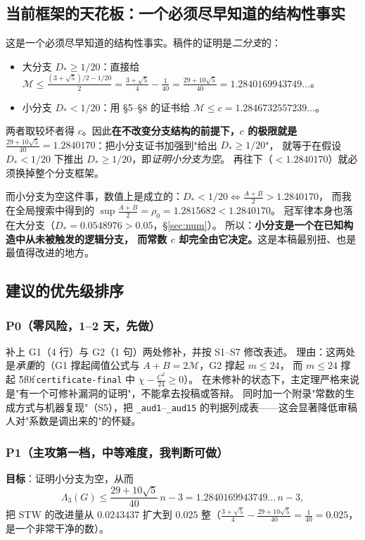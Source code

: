 \documentclass[UTF8,11pt]{ctexart}
\theoremstyle{definition}
\newcommand{\peq}[1]{\textup{\u5f0f}\,\texttt{#1}}
\begin{document}
\subsection{当前框架的天花板：一个必须尽早知道的结构性事实}

这是一个必须尽早知道的结构性事实。稿件的证明是\emph{二分支}的：
\begin{itemize}[leftmargin=1.6em,itemsep=1pt]
\item 大分支 $D_*\ge1/20$：直接给 $\mathcal M\le\frac{(3+\sqrt5)/2-1/20}{2}
=\frac{3+\sqrt5}4-\frac1{40}=\frac{29+10\sqrt5}{40}=1.2840169943749\ldots$。
\item 小分支 $D_*<1/20$：用 \S5--\S8 的证书给 $\mathcal M\le c=1.2846732557239\ldots$。
\end{itemize}
两者取较坏者得 $c$。因此\textbf{在不改变分支结构的前提下，$c$ 的极限就是
$\frac{29+10\sqrt5}{40}=1.2840170$}：把小分支证书加强到"给出 $D_*\ge1/20$"，
就等于在假设 $D_*<1/20$ 下推出 $D_*\ge1/20$，即\emph{证明小分支为空}。
再往下（$<1.2840170$）就必须换掉整个分支框架。

而小分支为空这件事，数值上是成立的：$D_*<1/20\iff\frac{A+B}2>1.2840170$，
而我在全局搜索中得到的 $\sup\frac{A+B}2=\rho_0=1.2815682<1.2840170$。
冠军律本身也落在大分支（$D_*=0.0548976>0.05$，\S\ref{sec:num}）。
所以：\textbf{小分支是一个在已知构造中从未被触发的逻辑分支，
而常数 $c$ 却完全由它决定。}这是本稿最别扭、也是最值得改进的地方。

\subsection{建议的优先级排序}

\subsubsection*{P0（零风险，1--2 天，先做）}
补上 G1（4 行）与 G2（1 句）两处修补，并按 S1--S7 修改表述。
理由：这两处是\emph{承重}的（G1 撑起阈值公式与 $A+B=2\mathcal M$，G2 撑起 $m\le24$，
而 $m\le24$ 撑起 \peq{certificate-final} 中 $\chi-\frac{C^2}{24}\ge0$）。
在未修补的状态下，主定理严格来说是"有一个可修补漏洞的证明"，不能拿去投稿或答辩。
同时加一个附录"常数的生成方式与机器复现"（S5），把 \texttt{\_aud1}--\texttt{\_aud15}
的判据列成表——这会显著降低审稿人对"系数是调出来的"的怀疑。

\subsubsection*{P1（主攻第一档，中等难度，我判断可做）}
\textbf{目标}：证明小分支为空，从而
\[
 \Lambda_3(G)\le\frac{29+10\sqrt5}{40}\,n-3=1.2840169943749\ldots\,n-3 ,
\]
把 STW 的改进量从 $0.0243437$ 扩大到 $0.025$ 整（$\frac{3+\sqrt5}4-\frac{29+10\sqrt5}{40}=\frac1{40}=0.025$，
是一个非常干净的数）。
\end{document}
